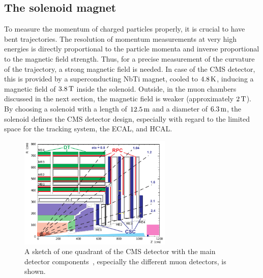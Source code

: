 \subsection{The solenoid magnet}
To measure the momentum of charged particles properly, it is crucial to have bent trajectories. The resolution of momentum measurements at very high energies is directly proportional to the particle momenta and inverse proportional to the magnetic field strength. Thus, for a precise measurement of the curvature of the trajectory, a strong magnetic field is needed. In case of the CMS detector, this is provided by a superconducting NbTi magnet, cooled to $4.8\,\text{K}$, inducing a magnetic field of $3.8\,\text{T}$ inside the solenoid. Outside, in the muon chambers discussed in the next section, the magnetic field is weaker (approximately $2\,\text{T}$). By choosing a solenoid with a length of $12.5\,\text{m}$ and a diameter of $6.3\,\text{m}$, the solenoid defines the CMS detector design, especially with regard to the limited space for the tracking system, the ECAL, and HCAL.

\begin{figure}[tbp]
 \centering
 \includegraphics[width=0.65\textwidth]{figures/general/muonChamber}
 \caption{A sketch of one quadrant of the CMS detector with the main detector components~\cite{CMSTDR}, especially the different muon detectors, is shown.}
 \label{fig:etaPlaneCMSTotal}
\end{figure}

